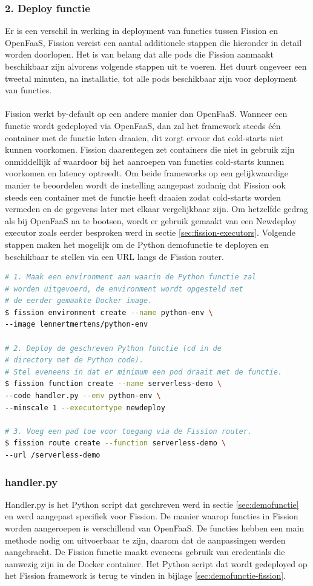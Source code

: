 \subsubsection{2. Deploy functie}
Er is een verschil in werking in deployment van functies tussen Fission en OpenFaaS, Fission vereist een aantal additionele stappen die hieronder in detail worden doorlopen. Het is van belang dat alle pods die Fission aanmaakt beschikbaar zijn alvorens volgende stappen uit te voeren. Het duurt ongeveer een tweetal minuten, na installatie, tot alle pods beschikbaar zijn voor deployment van functies.
\\\\
Fission werkt by-default op een andere manier dan OpenFaaS. Wanneer een functie wordt gedeployed via OpenFaaS, dan zal het framework steeds één container met de functie laten draaien, dit zorgt ervoor dat cold-starts niet kunnen voorkomen. Fission daarentegen zet containers die niet in gebruik zijn onmiddellijk af waardoor bij het aanroepen van functies cold-starts kunnen voorkomen en latency optreedt. Om beide frameworks op een gelijkwaardige manier te beoordelen wordt de instelling aangepast zodanig dat Fission ook steeds een container met de functie heeft draaien zodat cold-starts worden vermeden en de gegevens later met elkaar vergelijkbaar zijn. Om hetzelfde gedrag als bij OpenFaaS na te bootsen, wordt er gebruik gemaakt van een Newdeploy executor zoals eerder besproken werd in sectie \ref{sec:fission-executors}. Volgende stappen maken het mogelijk om de Python demofunctie te deployen en beschikbaar te stellen via een URL langs de Fission router.

\begin{lstlisting}[language=bash]
# 1. Maak een environment aan waarin de Python functie zal 
# worden uitgevoerd, de environment wordt opgesteld met 
# de eerder gemaakte Docker image.
$ fission environment create --name python-env \
--image lennertmertens/python-env

# 2. Deploy de geschreven Python functie (cd in de 
# directory met de Python code).
# Stel eveneens in dat er minimum een pod draait met de functie.
$ fission function create --name serverless-demo \
--code handler.py --env python-env \
--minscale 1 --executortype newdeploy

# 3. Voeg een pad toe voor toegang via de Fission router.
$ fission route create --function serverless-demo \
--url /serverless-demo
\end{lstlisting}
 
\subsubsection{handler.py}
Handler.py is het Python script dat geschreven werd in sectie \ref{sec:demofunctie} en werd aangepast specifiek voor Fission. De manier waarop functies in Fission worden aangeroepen is verschillend van OpenFaaS. De functies hebben een main methode nodig om uitvoerbaar te zijn, daarom dat de aanpassingen werden aangebracht. De Fission functie maakt eveneens gebruik van credentials die aanwezig zijn in de Docker container. Het Python script dat wordt gedeployed op het Fission framework is terug te vinden in bijlage \ref{sec:demofunctie-fission}.

